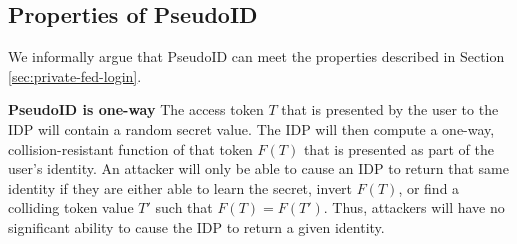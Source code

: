 \documentclass{llncs}
\begin{document}

\subsection{Properties of PseudoID}

We informally argue that PseudoID can meet the properties described in
Section \ref{sec:private-fed-login}. 

\begin{claim}[1]\textbf{PseudoID is one-way}
  The access token $T$ that is presented by the user to the IDP will
  contain a random secret value. The IDP will then compute a one-way,
  collision-resistant function of that token $F(T)$ that is presented
  as part of the user's identity. An attacker will only be able to
  cause an IDP to return that same identity if they are either able to
  learn the secret, invert $F(T)$, or find a colliding token value
  $T'$ such that $F(T) = F(T')$. Thus, attackers will have no
  significant ability to cause the IDP to return a given identity.
\end{claim}
\end{document}

